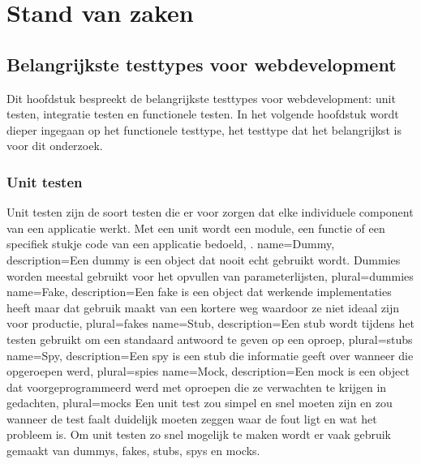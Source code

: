 \chapter{Stand van zaken}
\label{ch:stand-van-zaken}
\section{Belangrijkste testtypes voor webdevelopment}

Dit hoofdstuk bespreekt de belangrijkste testtypes voor webdevelopment: unit testen, integratie testen en functionele testen. In het volgende hoofdstuk wordt dieper ingegaan op het functionele testtype, het testtype dat het belangrijkst is voor dit onderzoek.

\subsection{Unit testen}

Unit testen zijn de soort testen die er voor zorgen dat elke individuele component van een applicatie werkt. Met een unit wordt een module, een functie of een specifiek stukje code van een applicatie bedoeld, \textcite{Elliott2016}.
{
    name=Dummy,
    description={Een dummy is een object dat nooit echt gebruikt wordt. Dummies worden meestal gebruikt voor het opvullen van parameterlijsten, \textcite{Fowler2007}}
    plural={dummies}
}
{
    name=Fake,
    description={Een fake is een object dat werkende implementaties heeft maar dat gebruik maakt van een kortere weg waardoor ze niet ideaal zijn voor productie, \textcite{Fowler2007}}
    plural={fakes}
}
{
    name=Stub,
    description={Een stub wordt tijdens het testen gebruikt om een standaard antwoord te geven op een oproep, \textcite{Fowler2007}}
    plural={stubs}
}
{
    name=Spy,
    description={Een spy is een \gls{stub} die informatie geeft over wanneer die opgeroepen werd, \textcite{Fowler2007}}
    plural={spies}
}
{
    name=Mock,
    description={Een mock is een object dat voorgeprogrammeerd werd met oproepen die ze verwachten te krijgen in gedachten, \textcite{Fowler2007}}
    plural={mocks}
}
Een unit test zou simpel en snel moeten zijn en zou wanneer de test faalt duidelijk moeten zeggen waar de fout ligt en wat het probleem is. Om unit testen zo snel mogelijk te maken wordt er vaak gebruik gemaakt van \glspl{dummy}, \glspl{fake}, \glspl{stub}, \glspl{spy} en \glspl{mock}. 

